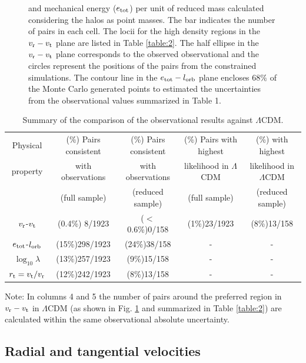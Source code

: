 \documentclass{emulateapj}
\begin{document}
\begin{figure}
\begin{center}
{  and mechanical energy ($e_{\rm tot}$) per unit of reduced mass
  calculated considering the halos as point masses. The bar indicates
  the number of pairs in each cell. The locii for the high
  density regions in the $v_{\rm r}-v_{\rm t}$ plane are listed in
  Table \ref{table:2}. 
  The half ellipse in the $v_{\rm r}-v_{\rm t}$ plane corresponds to
  the observed observational and the circles represent the positions
  of the pairs from the constrained simulations. The contour line in
  the $e_{\rm tot}-l_{\rm orb}$ plane encloses $68\%$ of the Monte
  Carlo generated points to estimated the uncertainties from the
  observational values summarized in Table 1.}
\label{fig:rt}
\end{center}

\end{figure}


\begin{table}
\caption{Summary of the comparison of the observational results
  against $\Lambda$CDM.}
\begin{center}
\begin{tabular}{ccccc}\hline
Physical & (\%) Pairs consistent & (\%) Pairs consistent & (\%) Pairs
with highest & (\%) with highest\\ 
property & with observations & with observations & likelihood in
$\Lambda$CDM & likelihood in $\Lambda$CDM\\ 
 & (full sample) & (reduced sample) & (full sample) & (reduced sample)\\ \hline
$v_{\rm r}$-$v_{\rm t}$ & (0.4\%) 8/1923 & ($<$0.6\%)0/158 & (1\%)23/1923 & (8\%)13/158\\
$e_{\rm tot}$-$l_{\rm orb}$ & (15\%)298/1923 & (24\%)38/158 & - & -\\
$\log_{10}\lambda$ & (13\%)257/1923 & (9\%)15/158 & - & -\\
$r_{\rm t}=v_{\rm t}/v_{\rm r}$& (12\%)242/1923 & (8\%)13/158 & -& -\\\hline
\end{tabular}
\end{center}
\vspace{1mm}
Note: In columns 4 and 5 the number of pairs around the preferred region
in $v_{\rm r}-v_{\rm t}$ in $\Lambda$CDM (as shown in
Fig. \ref{fig:rt} and summarized in Table \ref{table:2}) are
calculated within the same observational absolute uncertainty.
\label{table:3}
\end{table}



\subsection{Radial and tangential velocities}
\end{document}
